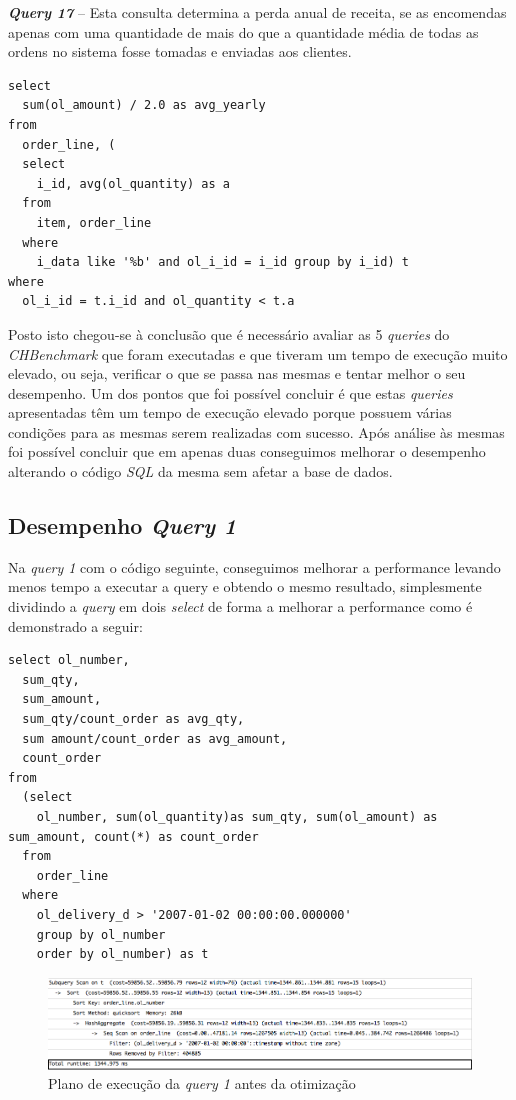 \textbf{\textit{Query 17}} – Esta consulta determina a perda anual de receita, se as encomendas apenas com uma quantidade de mais do que a quantidade média de todas as ordens no sistema fosse tomadas e enviadas aos clientes.

\begin{verbatim}
select
  sum(ol_amount) / 2.0 as avg_yearly
from
  order_line, (
  select
    i_id, avg(ol_quantity) as a
  from
    item, order_line
  where
    i_data like '%b' and ol_i_id = i_id group by i_id) t
where
  ol_i_id = t.i_id and ol_quantity < t.a
\end{verbatim}


Posto isto chegou-se à conclusão que é necessário avaliar as 5 \textit{queries} do \textit{CHBenchmark} que foram executadas e que tiveram um tempo de execução muito elevado, ou seja, verificar o que se passa nas mesmas e tentar melhor o seu desempenho. Um dos pontos que foi possível concluir é que estas \textit{queries} apresentadas têm um tempo de execução elevado porque possuem várias condições para as mesmas serem realizadas com sucesso. Após análise às mesmas foi possível concluir que em apenas duas conseguimos melhorar o desempenho alterando o código \textit{SQL} da mesma sem afetar a base de dados.\\

\newpage

\subsection{Desempenho \textit{Query 1}}

Na \textit{query 1} com o código seguinte, conseguimos melhorar a performance levando menos tempo a executar a query e obtendo o mesmo resultado, simplesmente dividindo a \textit{query} em dois \textit{select} de forma a melhorar a performance como é demonstrado a seguir:

\begin{verbatim}
select ol_number,
  sum_qty,
  sum_amount,
  sum_qty/count_order as avg_qty,
  sum amount/count_order as avg_amount,
  count_order
from
  (select
    ol_number, sum(ol_quantity)as sum_qty, sum(ol_amount) as sum_amount, count(*) as count_order
  from
    order_line
  where
    ol_delivery_d > '2007-01-02 00:00:00.000000'
    group by ol_number
    order by ol_number) as t
\end{verbatim}

\begin{figure}[ht!]
\centering
\includegraphics[width=\textwidth]{img/00_query1_ant}
\caption{Plano de execução da \textit{query 1} antes da otimização \label{overflow}}
\end{figure}

